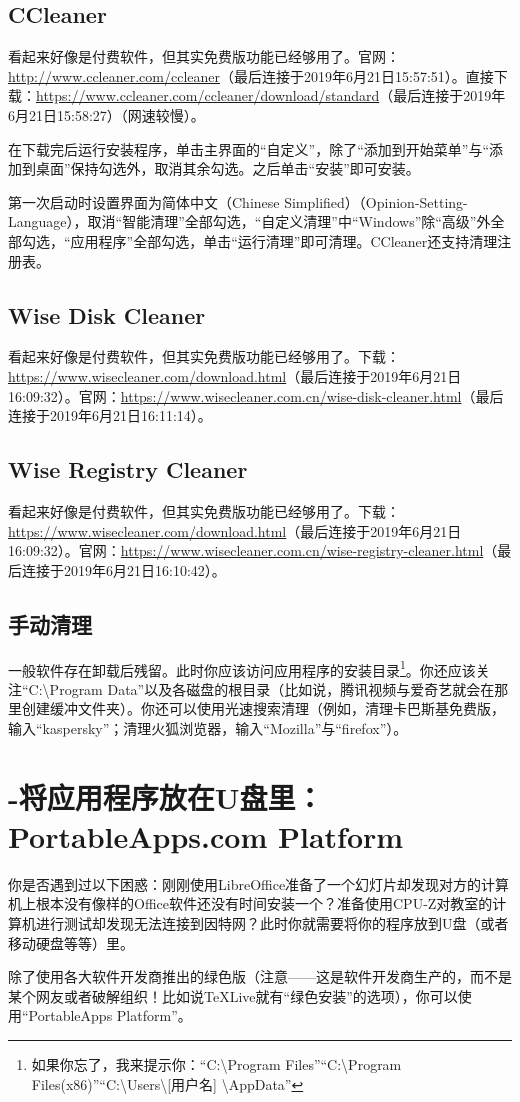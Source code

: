 \subsection{CCleaner}
看起来好像是付费软件，但其实免费版功能已经够用了。官网：\url{http://www.ccleaner.com/ccleaner}（最后连接于2019年6月21日15:57:51）。直接下载：\url{https://www.ccleaner.com/ccleaner/download/standard}（最后连接于2019年6月21日15:58:27）（网速较慢）。\par
在下载完后运行安装程序，单击主界面的“自定义”，除了“添加到开始菜单”与“添加到桌面”保持勾选外，取消其余勾选。之后单击“安装”即可安装。\par
第一次启动时设置界面为简体中文（Chinese Simplified）（Opinion-Setting-Language），取消“智能清理”全部勾选，“自定义清理”中“Windows”除“高级”外全部勾选，“应用程序”全部勾选，单击“运行清理”即可清理。CCleaner还支持清理注册表。
\subsection{Wise Disk Cleaner}
看起来好像是付费软件，但其实免费版功能已经够用了。下载：\url{https://www.wisecleaner.com/download.html}（最后连接于2019年6月21日16:09:32）。官网：\url{https://www.wisecleaner.com.cn/wise-disk-cleaner.html}（最后连接于2019年6月21日16:11:14）。
\subsection{Wise Registry Cleaner}
看起来好像是付费软件，但其实免费版功能已经够用了。下载：\url{https://www.wisecleaner.com/download.html}（最后连接于2019年6月21日16:09:32）。官网：\url{https://www.wisecleaner.com.cn/wise-registry-cleaner.html}（最后连接于2019年6月21日16:10:42）。
\subsection{手动清理}
一般软件存在卸载后残留。此时你应该访问应用程序的安装目录\footnote{如果你忘了，我来提示你：“C:\textbackslash Program Files”“C:\textbackslash Program Files(x86)”“C:\textbackslash Users\textbackslash [用户名] \textbackslash AppData”}。你还应该关注“C:\textbackslash Program Data”以及各磁盘的根目录（比如说，腾讯视频与爱奇艺就会在那里创建缓冲文件夹）。你还可以使用光速搜索清理（例如，清理卡巴斯基免费版，输入“kaspersky”；清理火狐浏览器，输入“Mozilla”与“firefox”）。{\color{red}{注意！你只应清理你熟知的文件。}}
\section{-将应用程序放在U盘里：PortableApps.com Platform}
你是否遇到过以下困惑：刚刚使用LibreOffice准备了一个幻灯片却发现对方的计算机上根本没有像样的Office软件还没有时间安装一个？准备使用CPU-Z对教室的计算机进行测试却发现无法连接到因特网？此时你就需要将你的程序放到U盘（或者移动硬盘等等）里。\par
除了使用各大软件开发商推出的绿色版（注意——这是软件开发商生产的，而不是某个网友或者破解组织！比如说TeXLive就有“绿色安装”的选项），你可以使用“PortableApps Platform”。